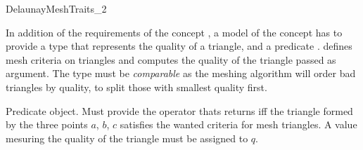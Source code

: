 \begin{ccRefConcept}{DelaunayMeshTraits_2}

\ccDefinition

In addition of the requirements of the concept
, a model of the concept
\ccRefName{} has to provide a type  that represents the
quality of a triangle, and a predicate .  defines
mesh criteria on triangles and computes the quality of the triangle passed
as argument. The type  must be \emph{comparable} as the
meshing algorithm will order bad triangles by quality, to split those with
smallest quality first.

\ccRefines


\ccTypes


 {Predicate object. Must provide the operator
   thats
  returns  iff the triangle formed by the three points $a$,
  $b$, $c$ satisfies the wanted criteria for mesh triangles. A value
  mesuring the quality of the triangle must be assigned to $q$.}




\ccHasModels
{}\\

\end{ccRefConcept}

